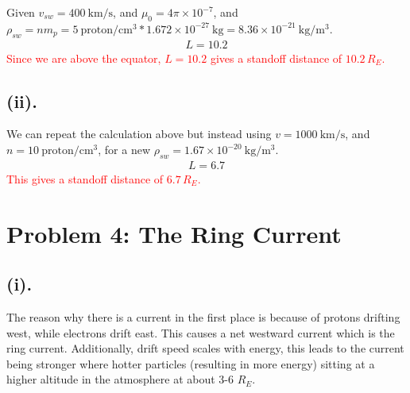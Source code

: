 \documentclass[11pt]{article}
\begin{document}
\hspace*{2em}Given $v_{sw} = 400~\mathrm{km/s}$, and $\mu_0 = 4\pi \times 10^{-7}$, 
and $\rho_{sw} = nm_p = 5~\mathrm{proton/cm^3}*1.672\times10^{-27}~\mathrm{kg} = 8.36\times10^{-21}~\mathrm{kg/m^3}$.
\begin{gather*}
\boxed{L = 10.2}
\end{gather*}
\hspace*{2em}\textcolor{red}{Since we are above the equator, $L = 10.2$ gives a standoff distance of $10.2\,R_E$.}

\subsection*{(ii).}
\hspace*{2em}We can repeat the calculation above but instead using $v=1000~\mathrm{km/s}$, and $n=10~\mathrm{proton/cm^3}$, for a new $\rho_{sw} = 1.67\times10^{-20}~\mathrm{kg/m^3}$.
\begin{gather*}
\boxed{L = 6.7}
\end{gather*}
\hspace*{2em}\textcolor{red}{This gives a standoff distance of $6.7\,R_E$.}


\newpage
\section*{Problem 4: The Ring Current}
\subsection*{(i).}
\hspace*{2em}The reason why there is a current in the first place is because of protons drifting west, while electrons drift east. This causes a net westward current which is the ring current. Additionally, drift speed scales with energy, this leads to the current being stronger where hotter particles (resulting in more energy) sitting at a higher altitude in the atmosphere at about 3-6 $R_E$.
\end{document}
